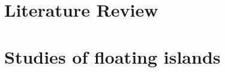 \section{Literature Review}
\label{ch:literaturereview}





\label{ch: background and literature}


\section{Studies of floating islands}
\label{sec: floating islands}



